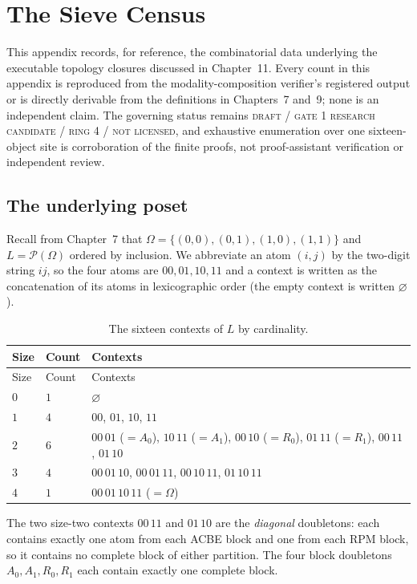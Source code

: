 \chapter{The Sieve Census}\label{appB:census}

This appendix records, for reference, the combinatorial data underlying the
executable topology closures discussed in Chapter~11. Every count in this
appendix is reproduced from the modality-composition verifier's registered
output or is directly derivable from the definitions in Chapters~7 and~9; none
is an independent claim. The governing status remains \textsc{draft / gate 1
research candidate / ring 4 / not licensed}, and exhaustive enumeration over one
sixteen-object site is corroboration of the finite proofs, not proof-assistant
verification or independent review.

\section{The underlying poset}\label{appB:poset}

Recall from Chapter~7 that $\Omega=\{(0,0),(0,1),(1,0),(1,1)\}$ and
$L=\mathcal{P}(\Omega)$ ordered by inclusion. We abbreviate an atom $(i,j)$ by
the two-digit string $ij$, so the four atoms are $00,01,10,11$ and a context is
written as the concatenation of its atoms in lexicographic order (the empty
context is written $\varnothing$).

\begin{longtable}{@{}lll@{}}
\caption{The sixteen contexts of $L$ by cardinality.}\label{appB:contexts}\\
\toprule
Size & Count & Contexts \\
\midrule
\endfirsthead
\toprule
Size & Count & Contexts \\
\midrule
\endhead
\bottomrule
\endfoot
$0$ & $1$ & $\varnothing$ \\
$1$ & $4$ & $00$, $01$, $10$, $11$ \\
$2$ & $6$ & $00\,01$ ($=A_0$), $10\,11$ ($=A_1$), $00\,10$ ($=R_0$), $01\,11$ ($=R_1$), $00\,11$, $01\,10$ \\
$3$ & $4$ & $00\,01\,10$, $00\,01\,11$, $00\,10\,11$, $01\,10\,11$ \\
$4$ & $1$ & $00\,01\,10\,11$ ($=\Omega$) \\
\bottomrule
\end{longtable}

The two size-two contexts $00\,11$ and $01\,10$ are the \emph{diagonal}
doubletons: each contains exactly one atom from each ACBE block and one from
each RPM block, so it contains no complete block of either partition. The four
block doubletons $A_0,A_1,R_0,R_1$ each contain exactly one complete block.

